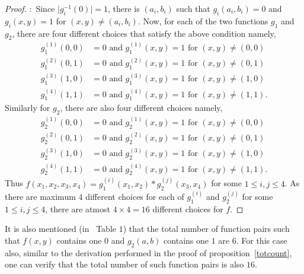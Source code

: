 \documentclass[]{svjour3}
\begin{document}
\begin{proof}
	:~Since $\mid g_i^{-1}(0) \mid = 1$, there is $(a_i, b_i)$ such that $g_i(a_i, b_i) = 0$ and $g_i(x, y) = 1$ for $(x, y) \neq (a_i, b_i)$. Now, for each of the two functions $g_1$ and $g_2$, there are four different choices that satisfy the above condition namely, 
	\begin{align}
		g_1^{(1)}(0, 0) &= 0 \text{ and } g_1^{(1)} (x, y) = 1 \text{ for } (x, y) \neq (0, 0)\\
		g_1^{(2)}(0, 1) &= 0 \text{ and } g_1^{(2)} (x, y) = 1 \text{ for } (x, y) \neq (0, 1)\\
		g_1^{(3)}(1, 0) &= 0 \text{ and } g_1^{(3)} (x, y) = 1 \text{ for } (x, y) \neq (1, 0)\\
		g_1^{(4)}(1, 1) &= 0 \text{ and } g_1^{(4)} (x, y) = 1 \text{ for } (x, y) \neq (1, 1). 
	\end{align} 
	Similarly for $g_2$, there are also four different choices namely, 
	\begin{align}
		g_2^{(1)}(0, 0) &= 0 \text{ and } g_2^{(1)} (x, y) = 1 \text{ for } (x, y) \neq (0, 0)\\
		g_2^{(2)}(0, 1) &= 0 \text{ and } g_2^{(2)} (x, y) = 1 \text{ for } (x, y) \neq (0, 1)\\
		g_2^{(3)}(1, 0) &= 0 \text{ and } g_2^{(3)} (x, y) = 1 \text{ for } (x, y) \neq (1, 0)\\
		g_2^{(4)}(1, 1) &= 0 \text{ and } g_2^{(4)} (x, y) = 1 \text{ for } (x, y) \neq (1, 1). 
	\end{align} 
	Thus $f(x_1, x_2, x_3, x_4) = g_1^{(i)} (x_1, x_2) * g_2^{(j)} (x_3, x_4)$ for some $1 \leq i, j \leq 4$. As there are maximum $4$ different choices for each of $g_1^{(i)}$ and $g_2^{(j)}$ for some $1 \leq i, j \leq 4$, there are atmost $4 \times 4 = 16$ different choices for $f$.
\end{proof}


It is also mentioned (in~\cite{NGA19} Table $1$) that the total number of function pairs such that $f(x,y)$ contains one $0$ and $g_2(a,b)$ contains one $1$ are $6$. For this case also, similar to the derivation performed in the proof of proposition~\ref{totcount}, one can verify that the total number of such function pairs is also $16$.
\end{document}
